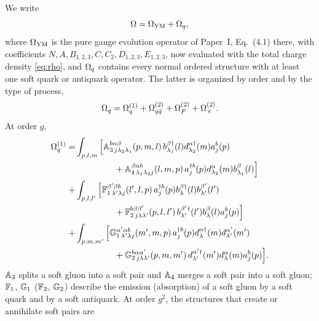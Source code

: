 We write
\begin{equation}
\Omega=\Omega_{\rm YM}+\Omega_{q},
\label{eq:OmegaSplit}
\end{equation}
where $\Omega_{\rm YM}$ is the pure gauge evolution operator of Paper~I, Eq.~(4.1) there, with
coefficients $N,A,B_{1,2,3},C,C_{2},D_{1,2,3},E_{1,2,3}$, now evaluated with the total charge
density \eqref{eq:rho}, and $\Omega_{q}$ contains every normal ordered structure with at least one
soft quark or antiquark operator. The latter is organized by order and by the type of process,
\begin{equation}
\Omega_{q}=\Omega^{(1)}_{q}+\Omega^{(2)}_{q\bar q}+\Omega^{(2)}_{F}+\Omega^{(2)}_{\times}.
\label{eq:Omqdecomp}
\end{equation}
At order $g$,
\begin{align}
\Omega^{(1)}_{q}=&\int_{p,l,m}\Big[\mathbb{A}^{b\alpha\beta}_{3\,j\lambda_{2}\lambda_{1}}(p,m,l)\,
b^{\beta\dagger}_{\lambda_{1}}(l)d^{\alpha\dagger}_{\lambda_{2}}(m)a^{b}_{j}(p)
\nonumber\\&\hspace{1.6cm}
+\mathbb{A}^{\beta\alpha b}_{4\,\lambda_{1}\lambda_{2}j}(l,m,p)\,
a^{\dagger b}_{j}(p)d^{\alpha}_{\lambda_{2}}(m)b^{\beta}_{\lambda_{1}}(l)\Big]
\nonumber\\
+&\int_{p,l,l'}\Big[\mathbb{F}^{\beta'\beta b}_{1\,\lambda'\lambda j}(l',l,p)\,
a^{\dagger b}_{j}(p)b^{\beta\dagger}_{\lambda}(l)b^{\beta'}_{\lambda'}(l')
\nonumber\\&\hspace{1.6cm}
+\mathbb{F}^{b\beta\beta'}_{2\,j\lambda\lambda'}(p,l,l')\,
b^{\beta'\dagger}_{\lambda'}(l')b^{\beta}_{\lambda}(l)a^{b}_{j}(p)\Big]
\nonumber\\
+&\int_{p,m,m'}\Big[\mathbb{G}^{\alpha'\alpha b}_{1\,\lambda'\lambda j}(m',m,p)\,
a^{\dagger b}_{j}(p)d^{\alpha\dagger}_{\lambda}(m)d^{\alpha'}_{\lambda'}(m')
\nonumber\\&\hspace{1.6cm}
+\mathbb{G}^{b\alpha\alpha'}_{2\,j\lambda\lambda'}(p,m,m')\,
d^{\alpha'\dagger}_{\lambda'}(m')d^{\alpha}_{\lambda}(m)a^{b}_{j}(p)\Big].
\label{eq:Om1q}
\end{align}
$\mathbb{A}_{3}$ splits a soft gluon into a soft pair and $\mathbb{A}_{4}$ merges a soft pair into a soft gluon;
$\mathbb{F}_{1}$, $\mathbb{G}_{1}$ ($\mathbb{F}_{2}$, $\mathbb{G}_{2}$) describe the emission (absorption) of a soft gluon
by a soft quark and by a soft antiquark. At order $g^{2}$, the structures that create or
annihilate soft pairs are
